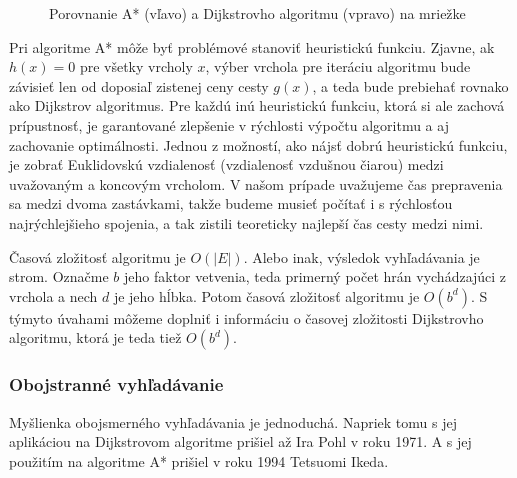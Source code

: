 \begin{figure}[H]
  \caption{Porovnanie A* (vľavo) a Dijkstrovho algoritmu (vpravo) na mriežke}
  \label{AStar_vs_Dijkstra}
\end{figure}

Pri algoritme A* môže byť problémové stanoviť heuristickú funkciu. Zjavne, ak $h(x)=0$ pre všetky vrcholy $x$, výber vrchola pre iteráciu algoritmu bude závisieť len od doposiaľ zistenej ceny cesty $g(x)$, a teda bude prebiehať rovnako ako Dijkstrov algoritmus. Pre každú inú heuristickú funkciu, ktorá si ale zachová prípustnosť, je garantované zlepšenie v rýchlosti výpočtu algoritmu a aj zachovanie optimálnosti. Jednou z možností, ako nájsť dobrú heuristickú funkciu, je zobrať Euklidovskú vzdialenosť (vzdialenosť vzdušnou čiarou) medzi uvažovaným a koncovým vrcholom. V našom prípade uvažujeme čas prepravenia sa medzi dvoma zastávkami, takže budeme musieť počítať i s rýchlosťou najrýchlejšieho spojenia, a tak zistili teoreticky najlepší čas cesty medzi nimi.\newline

Časová zložitosť algoritmu je $O(|E|)$. Alebo inak, výsledok vyhľadávania je strom. Označme $b$ jeho faktor vetvenia, teda primerný počet hrán vychádzajúci z vrchola a nech $d$ je jeho hĺbka. Potom časová zložitosť algoritmu je $O(b^{d})$. S týmyto úvahami môžeme doplniť i informáciu o časovej zložitosti Dijkstrovho algoritmu, ktorá je teda tiež $O(b^{d})$.\newline


\subsubsection{Obojstranné vyhľadávanie}

Myšlienka obojsmerného vyhľadávania je jednoduchá. Napriek tomu s jej aplikáciou na Dijkstrovom algoritme prišiel až Ira Pohl v roku 1971. A s jej použitím na algoritme A* prišiel v roku 1994 Tetsuomi Ikeda.\newline

